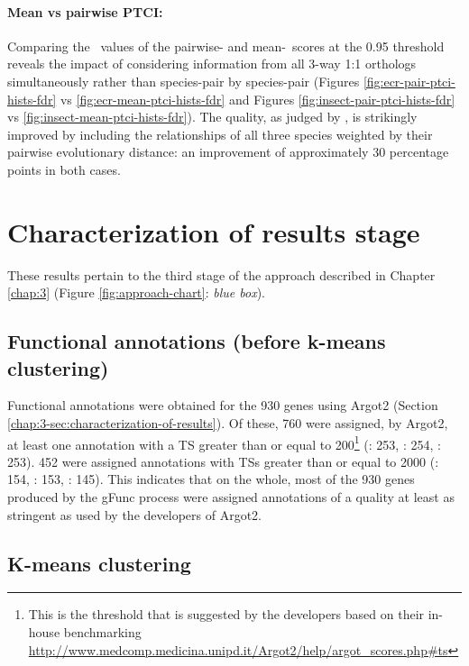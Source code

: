 \paragraph*{Mean vs pairwise PTCI:}
Comparing the \FDR\ values of the pairwise- and mean-\PTCI\ scores at the 0.95 threshold reveals the impact of considering information from all 3-way 1:1 orthologs simultaneously rather than species-pair by species-pair (Figures \ref{fig:ecr-pair-ptci-hists-fdr} vs \ref{fig:ecr-mean-ptci-hists-fdr} and Figures \ref{fig:insect-pair-ptci-hists-fdr} vs \ref{fig:insect-mean-ptci-hists-fdr}).
%
The quality, as judged by \FDR, is strikingly improved by including the relationships of all three species weighted by their pairwise evolutionary distance: an improvement of approximately 30 percentage points in both cases.

\section{Characterization of results stage}
These results pertain to the third stage of the approach described in Chapter \ref{chap:3} (Figure \ref{fig:approach-chart}: \textit{blue box}).

\subsection{Functional annotations (before k-means clustering)}

Functional annotations were obtained for the 930 genes using \gls{Argot2} (Section \ref{chap:3-sec:characterization-of-results}).
%
Of these, 760 were assigned, by \gls{Argot2}, at least one annotation with a \gls{TS} greater than or equal to 200\footnote{This is the threshold that is suggested by the developers based on their in-house benchmarking \url{http://www.medcomp.medicina.unipd.it/Argot2/help/argot\_scores.php\#ts}} (\Aa: 253, \Ag: 254, \Cq: 253).
%
452 were assigned annotations with \glspl{TS} greater than or equal to 2000 (\Aa: 154, \Ag: 153, \Cq: 145).
%
This indicates that on the whole, most of the 930 genes produced by the \gls{gFunc} process were assigned annotations of a quality at least as stringent as used by the developers of \gls{Argot2}.


\subsection{K-means clustering}


